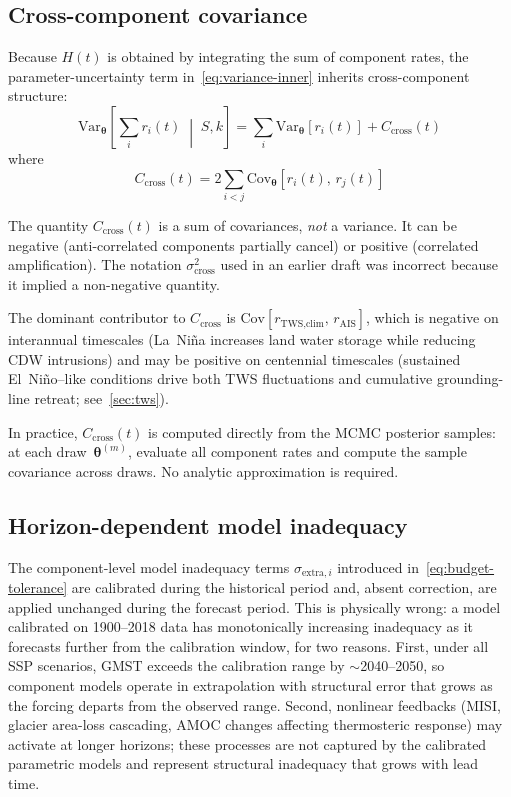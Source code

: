 \documentclass[11pt]{article}
\begin{document}
\subsection{Cross-component covariance}

Because $H(t)$ is obtained by integrating the sum of component rates, the parameter-uncertainty term in~\cref{eq:variance-inner} inherits cross-component structure:
\begin{equation}
  \text{Var}_{\boldsymbol{\theta}}\!\left[\sum_i r_i(t) \;\middle|\; S, k\right]
    = \sum_i \text{Var}_{\boldsymbol{\theta}}[r_i(t)]
    + C_{\text{cross}}(t)
  \label{eq:cross-cov}
\end{equation}
where
\begin{equation}
  C_{\text{cross}}(t) = 2 \sum_{i < j} \text{Cov}_{\boldsymbol{\theta}}[r_i(t),\, r_j(t)]
  \label{eq:Ccross}
\end{equation}

The quantity $C_{\text{cross}}(t)$ is a sum of covariances, \emph{not} a variance.  It can be negative (anti-correlated components partially cancel) or positive (correlated amplification).  The notation $\sigma_{\text{cross}}^2$ used in an earlier draft was incorrect because it implied a non-negative quantity.

The dominant contributor to $C_{\text{cross}}$ is $\text{Cov}[r_{\text{TWS,clim}},\, r_{\text{AIS}}]$, which is negative on interannual timescales (La~Ni\~na increases land water storage while reducing CDW intrusions) and may be positive on centennial timescales (sustained El~Ni\~no--like conditions drive both TWS fluctuations and cumulative grounding-line retreat; see~\cref{sec:tws}).

In practice, $C_{\text{cross}}(t)$ is computed directly from the MCMC posterior samples: at each draw~$\boldsymbol{\theta}^{(m)}$, evaluate all component rates and compute the sample covariance across draws.  No analytic approximation is required.

\subsection{Horizon-dependent model inadequacy}
\label{sec:horizon-inadequacy}

The component-level model inadequacy terms $\sigma_{\text{extra},i}$ introduced in~\cref{eq:budget-tolerance} are calibrated during the historical period and, absent correction, are applied unchanged during the forecast period.  This is physically wrong: a model calibrated on 1900--2018 data has monotonically increasing inadequacy as it forecasts further from the calibration window, for two reasons.  First, under all SSP scenarios, GMST exceeds the calibration range by $\sim$2040--2050, so component models operate in extrapolation with structural error that grows as the forcing departs from the observed range.  Second, nonlinear feedbacks (MISI, glacier area-loss cascading, AMOC changes affecting thermosteric response) may activate at longer horizons; these processes are not captured by the calibrated parametric models and represent structural inadequacy that grows with lead time.
\end{document}
